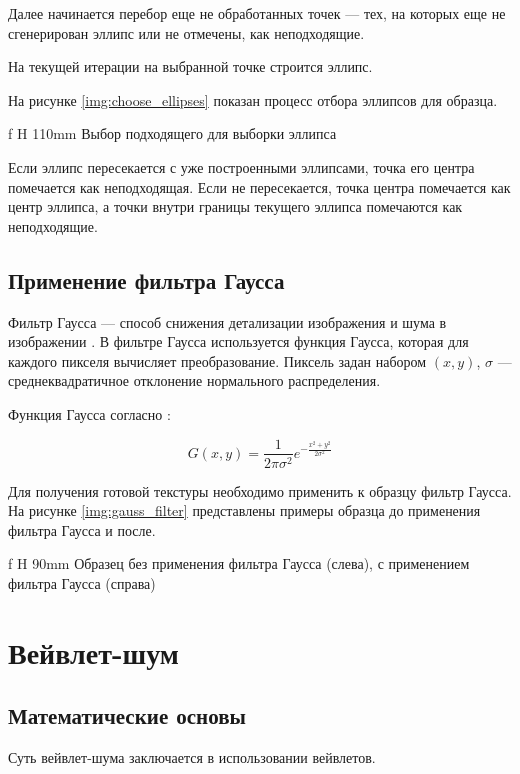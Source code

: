 Далее начинается перебор еще не обработанных точек --- тех, на которых еще не сгенерирован эллипс или не отмечены, как неподходящие.

На текущей итерации на выбранной точке строится эллипс.

На рисунке \ref{img:choose_ellipses} показан процесс отбора эллипсов для образца.

 {f} {H} {110mm}%
{Выбор подходящего для выборки эллипса}

Если эллипс пересекается с уже построенными эллипсами, точка его центра помечается как неподходящая. Если не пересекается, точка центра помечается как центр эллипса, а точки внутри границы текущего эллипса помечаются как неподходящие.

\subsection{Применение фильтра Гаусса}

Фильтр Гаусса --- способ снижения детализации изображения и шума в изображении \cite{mitskikh2018}.
В фильтре Гаусса используется функция Гаусса, которая для каждого пикселя вычисляет преобразование.
Пиксель задан набором $(x,y)$, $\sigma$ --- среднеквадратичное отклонение нормального распределения.

Функция Гаусса согласно \cite{haddad1991class}:

\begin{equation}\label{eq:gauss_fn}
	G(x,y)=\frac{1}{2\pi\sigma^2}e^{-\frac{x^2+y^2}{2\sigma^2}}
\end{equation}

Для получения готовой текстуры необходимо применить к образцу фильтр Гаусса.
На рисунке \ref{img:gauss_filter} представлены примеры образца до применения фильтра Гаусса и после.

 {f} {H} {90mm}%
{Образец без применения фильтра Гаусса (слева), с применением фильтра Гаусса (справа)}

\section{Вейвлет-шум}

\subsection{Математические основы}

Суть вейвлет-шума заключается в использовании вейвлетов.

